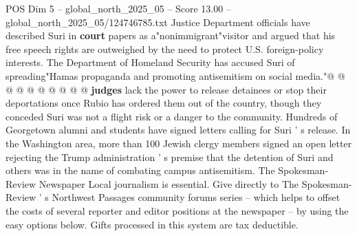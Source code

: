 \begin{textsample}{POS Dim 5 – global\_north\_2025\_05 – Score 13.00 – global\_north\_2025\_05/124746785.txt}
Justice Department officials have described Suri in \textbf{court} papers as a"nonimmigrant"visitor and argued that his free speech rights are outweighed by the need to protect U.S. foreign-policy interests.
The Department of Homeland Security has accused Suri of spreading"Hamas propaganda and promoting antisemitism on social media."@ @ @ @ @ @ @ @ @ @ \textbf{judges} lack the power to release detainees or stop their deportations once Rubio has ordered them out of the country, though they conceded Suri was not a flight risk or a danger to the community.
Hundreds of Georgetown alumni and students have signed letters calling for Suri ' s release.
In the Washington area, more than 100 Jewish clergy members signed an open letter rejecting the Trump administration ' s premise that the detention of Suri and others was in the name of combating campus antisemitism.
The Spokesman-Review Newspaper Local journalism is essential.
Give directly to The Spokesman-Review ' s Northwest Passages community forums series -- which helps to offset the costs of several reporter and editor positions at the newspaper -- by using the easy options below.
Gifts processed in this system are tax deductible.

\end{textsample}
